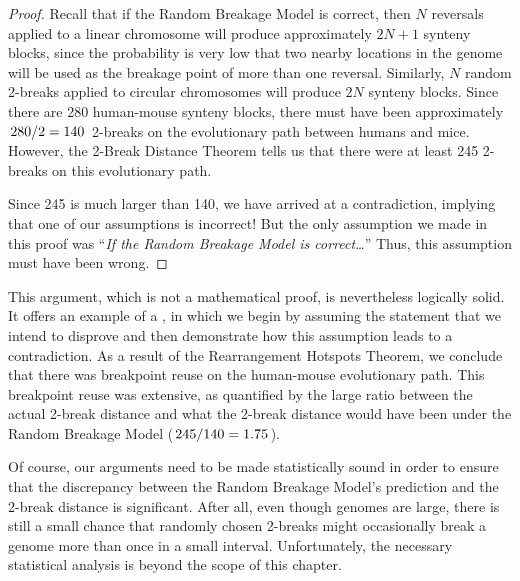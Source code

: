 \begin{proof}
Recall that if the Random Breakage Model is correct, then $N$ reversals applied to a linear chromosome will produce approximately $2N + 1$ synteny blocks, since the probability is very low that two nearby locations in the genome will be used as the breakage point of more than one reversal. Similarly, $N$ random 2-breaks applied to circular chromosomes will produce $2N$ synteny blocks. Since there are 280 human-mouse synteny blocks, there must have been approximately $\left. 280 \middle/ 2 = 140 \right.$ 2-breaks on the evolutionary path between humans and mice. However, the 2-Break Distance Theorem tells us that there were at least 245 2-breaks on this evolutionary path.\\

\begin{qbox}[
Is $245 \approx 140$?
]\end{qbox}

\vspace{-0.5\baselineskip}

\noindent Since 245 is much larger than 140, we have arrived at a contradiction, implying that one of our assumptions is incorrect! But the only assumption we made in this proof was ``\emph{If the Random Breakage Model is correct\ldots}'' Thus, this assumption must have been wrong.
\end{proof}

This argument, which is not a mathematical proof, is nevertheless logically solid.  It offers an example of a , in which we begin by assuming the statement that we intend to disprove and then demonstrate how this assumption leads to a contradiction. As a result of the Rearrangement Hotspots Theorem, we conclude that there was breakpoint reuse on the human-mouse evolutionary path.  This breakpoint reuse was extensive, as quantified by the large ratio between the actual 2-break distance and what the 2-break distance would have been under the Random Breakage Model ($\left. 245 \middle/ 140 = 1.75 \right.$).

Of course, our arguments need to be made statistically sound in order to ensure that the discrepancy between the Random Breakage Model's prediction and the 2-break distance is significant.  After all, even though genomes are large, there is still a small chance that randomly chosen 2-breaks might occasionally break a genome more than once in a small interval.  Unfortunately, the necessary statistical analysis is beyond the scope of this chapter.

